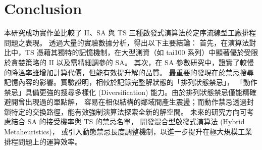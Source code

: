 \documentclass[conference]{IEEEtran}
\begin{document}
\clearpage

\section{Conclusion}
本研究成功實作並比較了 II、SA 與 TS 三種啟發式演算法於定序流線型工廠排程問題之表現。
透過大量的實驗數據分析，得出以下主要結論：
首先，在演算法對比中，TS 憑藉其獨特的記憶機制，在大型測資（如 tai100 系列）中顯著優於受限於貪婪策略的 II 以及需精細調參的 SA。
其次，在 SA 參數研究中，證實了較慢的降溫率雖增加計算代價，但能有效提升解的品質。
最重要的發現在於禁忌搜尋記憶內容的影響。實驗證明，相較於記錄完整解狀態的「排列狀態禁忌」，
「動作禁忌」具備更強的搜尋多樣化 (Diversification) 能力。由於排列狀態禁忌僅能精確避開曾出現過的單點解，
容易在相似結構的鄰域間產生震盪；而動作禁忌透過封鎖特定的交換路徑，能有效強制演算法探索全新的解空間。
未來的研究方向可考慮結合 SA 的接受機率與 TS 的禁忌名單，
開發混合型啟發式演算法 (Hybrid Metaheuristics)，
或引入動態禁忌長度調整機制，以進一步提升在極大規模工業排程問題上的運算效率。

\appendices
\end{document}

